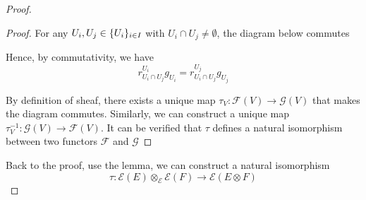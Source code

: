 \documentclass{article}
\begin{document}
\begin{lemma}
\begin{proof}
\begin{lemma}
\begin{proof}
    For any $U_i, U_j \in \{U_i\}_{i \in I}$ with $U_i \cap U_j \neq \emptyset$, the diagram below commutes
    \begin{center}
    \end{center}

    Hence, by commutativity, we have
    $$
        r^{U_i}_{U_i \cap U_j} g_{U_i} = r^{U_j}_{U_i \cap U_j} g_{U_j} 
    $$

    By definition of sheaf, there exists a unique map $\tau_V: \mathcal{F}(V) \to \mathcal{G}(V)$ that makes the diagram commutes. Similarly, we can construct a unique map $\tau_V^{-1}: \mathcal{G}(V) \to \mathcal{F}(V)$. It can be verified that $\tau$ defines a natural isomorphism between two functors $\mathcal{F}$ and $\mathcal{G}$
\end{proof}
\end{lemma}

    Back to the proof, use the lemma, we can construct a natural isomorphism
    $$
        \tau: \mathcal{E}(E) \otimes_\mathcal{E} \mathcal{E}(F) \to \mathcal{E}(E \otimes F)
    $$ 
\end{proof}
\end{lemma}
\end{document}
